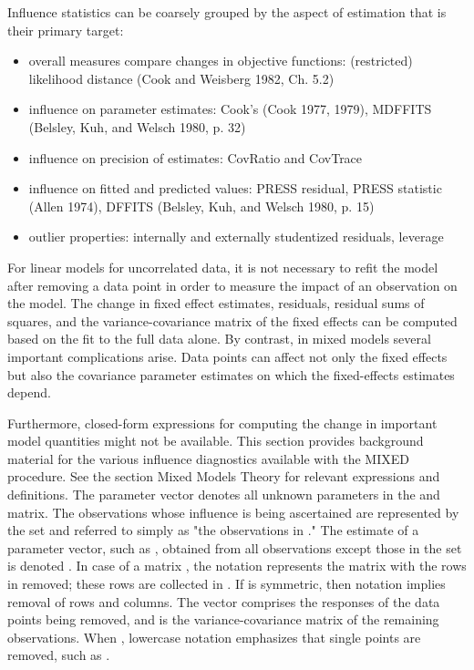 \documentclass[12pt, a4paper]{report}
\begin{document}
Influence statistics can be coarsely grouped by the aspect of estimation that is their primary target:
\begin{itemize}
	\item overall measures compare changes in objective functions: (restricted) likelihood distance (Cook and Weisberg 1982, Ch. 5.2)
	\item influence on parameter estimates: Cook’s  (Cook 1977, 1979), MDFFITS (Belsley, Kuh, and Welsch 1980, p. 32)
	\item influence on precision of estimates: CovRatio and CovTrace
	\item influence on fitted and predicted values: PRESS residual, PRESS statistic (Allen 1974), DFFITS (Belsley, Kuh, and Welsch 1980, p. 15)
	\item outlier properties: internally and externally studentized residuals, leverage
\end{itemize}
For linear models for uncorrelated data, it is not necessary to refit the model after removing a data point in order to measure the impact of an observation on the model. The change in fixed effect estimates, residuals, residual sums of squares, and the variance-covariance matrix of the fixed effects can be computed based on the fit to the full data alone. By contrast, in mixed models several important complications arise. Data points can affect not only the fixed effects but also the covariance parameter estimates on which the fixed-effects estimates depend. 

Furthermore, closed-form expressions for computing the change in important model quantities might not be available.
This section provides background material for the various influence diagnostics available with the MIXED procedure. See the section Mixed Models Theory for relevant expressions and definitions. The parameter vector  denotes all unknown parameters in the  and  matrix.
The observations whose influence is being ascertained are represented by the set  and referred to simply as "the observations in ." The estimate of a parameter vector, such as , obtained from all observations except those in the set  is denoted . In case of a matrix , the notation  represents the matrix with the rows in  removed; these rows are collected in . If  is symmetric, then notation  implies removal of rows and columns. The vector  comprises the responses of the data points being removed, and  is the variance-covariance matrix of the remaining observations. When , lowercase notation emphasizes that single points are removed, such as .
\end{document}
